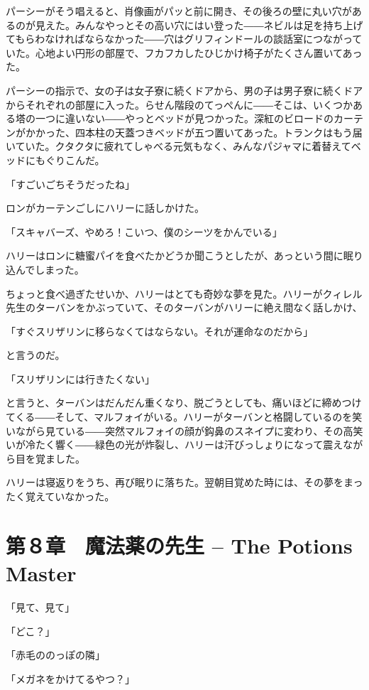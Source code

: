 \documentclass[10pt,a4paper]{article}
\begin{document}
\begin{CJK}{UTF8}{min}
パーシーがそう唱えると、肖像画がパッと前に開き、その後ろの壁に丸い穴があるのが見えた。みんなやっとその高い穴にはい登った――ネビルは足を持ち上げてもらわなければならなかった――穴はグリフィンドールの談話室につながっていた。心地よい円形の部屋で、フカフカしたひじかけ椅子がたくさん置いてあった。

パーシーの指示で、女の子は女子寮に続くドアから、男の子は男子寮に続くドアからそれぞれの部屋に入った。らせん階段のてっぺんに――そこは、いくつかある塔の一つに違いない――やっとベッドが見つかった。深紅のビロードのカーテンがかかった、四本柱の天蓋つきベッドが五つ置いてあった。トランクはもう届いていた。クタクタに疲れてしゃべる元気もなく、みんなパジャマに着替えてベッドにもぐりこんだ。

「すごいごちそうだったね」

ロンがカーテンごしにハリーに話しかけた。

「スキャバーズ、やめろ！こいつ、僕のシーツをかんでいる」

ハリーはロンに糖蜜パイを食べたかどうか聞こうとしたが、あっという間に眠り込んでしまった。

ちょっと食べ過ぎたせいか、ハリーはとても奇妙な夢を見た。ハリーがクィレル先生のターバンをかぶっていて、そのターバンがハリーに絶え間なく話しかけ、

「すぐスリザリンに移らなくてはならない。それが運命なのだから」

と言うのだ。

「スリザリンには行きたくない」

と言うと、ターバンはだんだん重くなり、脱ごうとしても、痛いほどに締めつけてくる――そして、マルフォイがいる。ハリーがターバンと格闘しているのを笑いながら見ている――突然マルフォイの顔が鈎鼻のスネイプに変わり、その高笑いが冷たく響く――緑色の光が炸裂し、ハリーは汗びっしょりになって震えながら目を覚ました。

ハリーは寝返りをうち、再び眠りに落ちた。翌朝目覚めた時には、その夢をまったく覚えていなかった。




\section{第８章　魔法薬の先生 -- The Potions Master}





「見て、見て」

「どこ？」

「赤毛ののっぽの隣」

「メガネをかけてるやつ？」


\end{CJK}
\end{document}
